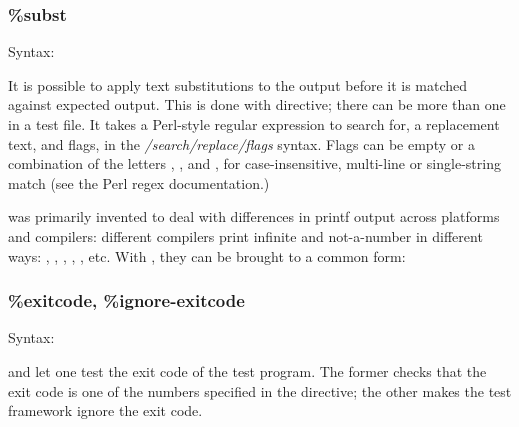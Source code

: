 \subsubsection{\%subst}
\label{sec:testing:opptest:subst}

Syntax:

\begin{filelisting}
\end{filelisting}

It is possible to apply text substitutions to the output before it is
matched against expected output. This is done with 
directive; there can be more than one  in a test file. It
takes a Perl-style regular expression to search for, a replacement text,
and flags, in the \textit{/search/replace/flags} syntax. Flags can be empty
or a combination of the letters , , and , for
case-insensitive, multi-line or single-string match (see the Perl regex
documentation.)

 was primarily invented to deal with differences in printf
output across platforms and compilers: different compilers print infinite
and not-a-number in different ways: , , ,
, ,  etc. With , they can be
brought to a common form:

\begin{filelisting}
\end{filelisting}

\subsubsection{\%exitcode, \%ignore-exitcode}
\label{sec:testing:opptest:exitcode}

Syntax:
\begin{filelisting}
\end{filelisting}

\begin{filelisting}
\end{filelisting}

 and  let one test the exit code of the
test program. The former checks that the exit code is one of the numbers specified in
the directive; the other makes the test framework ignore the exit code.

